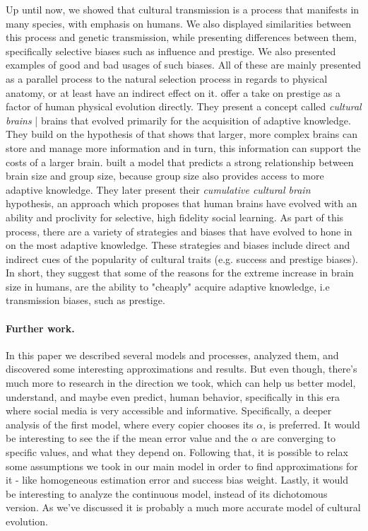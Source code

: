 \documentclass[12pt]{extarticle}
\begin{document}
Up until now, we showed that cultural transmission is a process that manifests in many species, with emphasis on humans. We also displayed similarities between this process and genetic transmission, while presenting differences between them, specifically selective biases such as influence and prestige. We also presented examples of good and bad usages of such biases. All of these are mainly presented as a parallel process to the natural selection process in regards to physical anatomy, or at least have an indirect effect on it. \citet{collective_brains} offer a take on prestige as a factor of human physical evolution directly. They present a concept called \textit{cultural brains} | brains that evolved primarily for the acquisition of adaptive knowledge.
They build on the hypothesis of \citet{social_brains} that shows that larger, more complex brains can store and manage more information and in turn, this information can support the costs of a larger brain.
\citet{collective_brains} built a model that predicts a strong relationship between brain size and group size, because group size also provides access to more adaptive knowledge. They later present their \textit{cumulative cultural brain} hypothesis, an approach which proposes that human brains have evolved with an ability and proclivity for selective, high fidelity social learning. As part of this process, there are a variety of strategies and biases that have evolved to hone in on the most adaptive knowledge. These strategies and biases include direct and indirect cues of the popularity of cultural traits (e.g. success and prestige biases).
In short, they suggest that some of the reasons for the extreme increase in brain size in humans, are the ability to "cheaply" acquire adaptive knowledge, i.e transmission biases, such as prestige.

\paragraph{Further work.}
In this paper we described several models and processes, analyzed them, and discovered some interesting approximations and results. But even though, there's much more to research in the direction we took, which can help us better model, understand, and maybe even predict, human behavior, specifically in this era where social media is very accessible and informative.
Specifically, a deeper analysis of the first model, where every copier chooses its $\alpha$, is preferred. It would be interesting to see the if the mean error value and the $\alpha$ are converging to specific values, and what they depend on.
Following that, it is possible to relax some assumptions we took in our main model in order to find approximations for it - like homogeneous estimation error and success bias weight.
Lastly, it would be interesting to analyze the continuous model, instead of its dichotomous version. As we've discussed it is probably a much more accurate model of cultural evolution.
\end{document}
